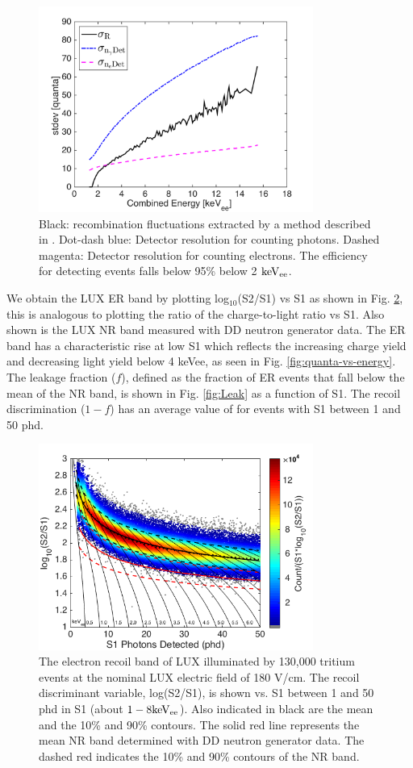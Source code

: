 \begin{figure}[h!]\centering
\includegraphics[width=90mm]{fig/recomb_flucs.png}
\caption{Black: recombination fluctuations extracted by a method described in \cite{Dobi_Thesis}. Dot-dash blue: Detector resolution for counting photons. Dashed magenta: Detector resolution for counting electrons. The efficiency for detecting events falls below 95\% below 2 $\rm keV_{ee}$.}
\label{fig:recomb-flucs}
\end{figure}

We obtain the LUX ER band by plotting log$_{10}$(S2/S1) vs S1 as shown in Fig. \ref{fig:ER_band}, this is analogous to plotting the ratio of the charge-to-light ratio vs S1. Also shown is the LUX NR band measured with DD neutron generator data. The ER band has a characteristic rise at low S1 which reflects the increasing charge yield and decreasing light yield below 4 keVee, as seen in Fig. \ref{fig:quanta-vs-energy}. The leakage fraction ($f$), defined as the fraction of ER events that fall below the mean of the NR band, is shown in Fig. \ref{fig:Leak} as a function of S1. The recoil discrimination ($1-f$) has an average value of  for events with S1 between 1 and 50 phd.

\begin{figure}[h!]\centering
\includegraphics[width=90mm]{fig/CH3T_ER_Band.png}
\caption{The electron recoil band of LUX illuminated by 130,000 tritium events at the nominal LUX electric field of 180 V/cm.  The recoil discriminant variable, log(S2/S1), is shown vs. S1 between 1 and 50 phd in S1 (about $\rm1-8 keV_{ee}$). Also indicated in black are the mean and the 10\% and 90\% contours. The solid red line represents the mean NR band determined with DD neutron generator data. The dashed red indicates the 10\% and 90\% contours of the NR band.}
\label{fig:ER_band}
\end{figure}

